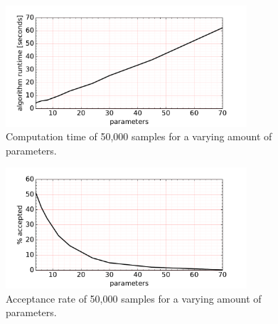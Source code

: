 \begin{figure}
	\centering
	\includegraphics[width=0.8\textwidth]{figures/linear_systems/higher_dim/performance}
	\caption{Computation time of 50,000 samples for a varying amount of parameters.}
	\label{fig:linear_system.high_dim.time}
\end{figure}

\begin{figure}
	\centering
	\includegraphics[width=0.8\textwidth]{figures/linear_systems/higher_dim/acceptance_rate}
	\caption{Acceptance rate of 50,000 samples for a varying amount of parameters.}
	\label{fig:linear_system.high_dim.acceptance}
\end{figure}









